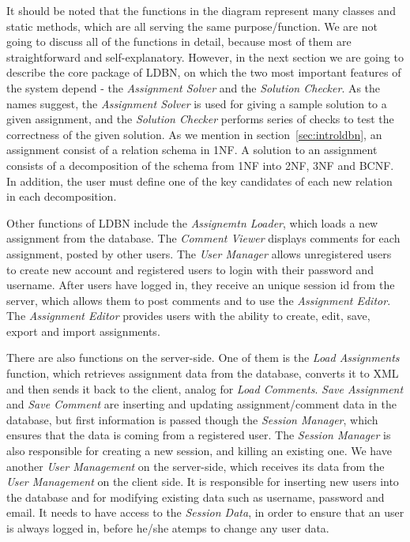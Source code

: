 It should be noted that the functions in the diagram represent many classes and 
static methods, which are all serving the same purpose/function. We are not 
going to discuss all 
of the functions in detail, because most of them are straightforward and 
self-explanatory. 
However, in the next section we are going to describe the core package of LDBN,
on which the two most important features of the system depend - 
the \textit{Assignment Solver} and the \textit{Solution Checker}. 
As the names suggest, the 
\textit{Assignment Solver} is used
for giving a sample solution to a given assignment, and the \textit{Solution Checker}
performs series of checks to test the correctness of the given solution.
As we mention in section~\ref{sec:introldbn}, an assignment consist of a 
relation schema in 1NF. A solution to an assignment consists 
of a decomposition of the schema from 1NF into 2NF, 3NF and BCNF. In addition,
the user must define one of the key candidates of each new relation in each
decomposition. 

Other functions of LDBN include the \textit{Assignemtn Loader}, which loads 
a new assignment from the database. The \textit{Comment Viewer} displays comments for
each assignment, posted by other users. The \textit{User Manager} 
allows unregistered users to create new account and registered users to login with 
their password and username. After users have logged in, they receive an unique 
session id from the server, which allows them to post comments and to use the 
\textit{Assignment Editor}. The \textit{Assignment Editor} provides users with 
the ability to create, edit, save, export and import assignments. 

There are also functions on the server-side. One of them is 
the \textit{Load Assignments} function, which retrieves assignment data from the database,
converts it to XML and then sends it back to the client, analog for \textit{Load Comments}.
\textit{Save Assignment} and \textit{Save Comment} are inserting and updating assignment/comment data in the database, but
first information is passed though the \textit{Session Manager}, which ensures that the data
is coming from a registered user. The \textit{Session Manager} is also responsible for creating
a new session, and killing an existing one. We have another \textit{User Management} on the server-side, which
receives its data from the \textit{User Management} on the client side. It is responsible 
for inserting new users into the database and for modifying existing data such as username, password and email.
It needs to have access to the \textit{Session Data}, in order to ensure that an 
user is always logged in,
before he/she atemps to change any user data.    

